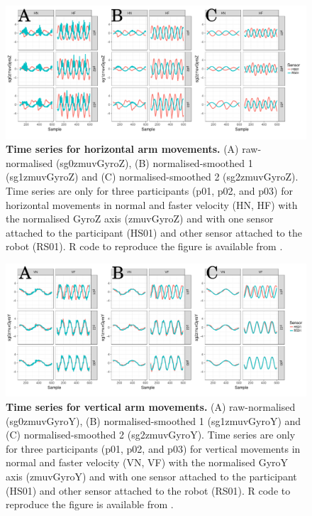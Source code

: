 \begin{figure}[!h]
  \centering
\includegraphics[width=1.0\textwidth]{tsHv03}
    	\caption{ 
	{\bf Time series for horizontal arm movements.}
		(A) raw-normalised (sg0zmuvGyroZ), 
		(B) normalised-smoothed 1 (sg1zmuvGyroZ) and
		(C) normalised-smoothed 2 (sg2zmuvGyroZ).
		Time series are only for three participants (p01, p02, and p03) 
		for horizontal movements in normal and faster velocity (HN, HF) 
		with the normalised GyroZ axis (zmuvGyroZ) 
		and with one sensor attached to the participant (HS01) 
		and other sensor attached to the robot (RS01).	
	R code to reproduce the figure is available from \cite{hwum2018}.
        }
    \label{fig:tsH}
\end{figure}
\begin{figure}[!h]
  \centering
\includegraphics[width=1.0\textwidth]{tsVv03}
	\caption{ 
	{\bf Time series for vertical arm movements.}
		(A) raw-normalised (sg0zmuvGyroY), 
		(B) normalised-smoothed 1 (sg1zmuvGyroY) and
		(C) normalised-smoothed 2 (sg2zmuvGyroY).
		Time series are only for three participants (p01, p02, and p03) 
		for vertical movements in normal and faster velocity (VN, VF) 
		with the normalised GyroY axis (zmuvGyroY) 
		and with one sensor attached to the participant (HS01) 
		and other sensor attached to the robot (RS01).
		R code to reproduce the figure is available from \cite{hwum2018}.
        }
    \label{fig:tsV}
\end{figure}









